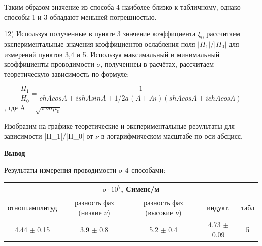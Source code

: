 \documentclass[a4paper,12pt]{article}
\begin{document}
Таким образом значение из способа 4 наиболее близко к табличному, однако способы 1 и 3 обладают меньшей погрешностью.

\par12) Используя полученные в пункте 3 значение коэффициента $\xi_0$ рассчитаем экспериментальные значения коэффициентов ослабления поля $|H_1|/|H_0|$ для измерений пунктов 3,4 и 5. Используя максимальный и минимальный коэффициенты проводимости $\sigma$, полученнеы в расчётах, рассчитаем теоретическую зависимость по формуле: 

$$ \frac{H_1}{H_0} = \frac{1}{chAcosA + ishAsinA + 1/2a(A+Ai)(shAcosA + ichAcosA)} $$, где A = $\sqrt{\pi \nu \sigma \mu_0}$

Изобразим на графике теоретические и экспериментальные результаты для зависимости |H_1|/|H_0| от $\nu$ в логарифмическом масштабе по оси абсцисс.



\par\textbf{Вывод}

Результаты измерения проводимости $\sigma$ 4 способами:

\begin{center}
 \begin{tabular}{|c|c|c|c|c|}
     \hline
     \multicolumn{5}{|c|}{$\sigma \cdot {10}^7$, Сименс/м}\\
     \hline
     отнош.амплитуд & разность фаз (низкие $\nu$) & разность фаз (высокие $\nu$) & индукт. & табл \\
     \hline
     4.44 $\pm$ 0.15 & 3.9 $\pm$ 0.8 & 5.2 $\pm$ 0.4 & 4.73 $\pm$ 0.09 & 5 \\
     \hline
\end{tabular}
\end{center}
\end{document}
